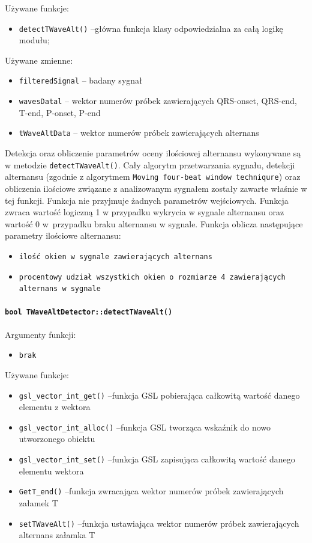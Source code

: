 \documentclass[a4paper, 11pt]{article}
\begin{document}
Używane funkcje:
\begin{itemize}
\item \verb+detectTWaveAlt()+ --główna funkcja klasy odpowiedzialna za całą logikę modułu;
\end{itemize}

\medskip{}

Używane zmienne:
\begin{itemize}
\item \verb+filteredSignal+ --  badany sygnał
\item \verb+wavesDatal+ -- wektor numerów próbek zawierających QRS-onset, QRS-end, T-end, P-onset, P-end
\item \verb+tWaveAltData+ -- wektor numerów próbek zawierających alternans
\end{itemize}


\medskip{}

Detekcja oraz obliczenie parametrów oceny ilościowej alternansu wykonywane są w metodzie  \verb|detectTWaveAlt()|. Cały algorytm przetwarzania sygnału, detekcji alternansu (zgodnie z algorytmem  \verb|Moving four-beat window techniqure|) oraz obliczenia ilościowe związane z analizowanym sygnałem zostały zawarte właśnie w tej funkcji. Funkcja nie przyjmuje żadnych parametrów wejściowych. Funkcja zwraca wartość logiczną 1 w przypadku wykrycia w sygnale alternansu oraz wartość 0 w~przypadku braku alternansu w sygnale. Funkcja oblicza następujące parametry ilościowe alternansu:
\begin{itemize}
\item \verb+ilość okien w sygnale zawierających alternans+
\item \verb+procentowy udział wszystkich okien o rozmiarze 4 zawierających alternans w sygnale+
\end{itemize}


\paragraph{\texttt{bool TWaveAltDetector::detectTWaveAlt()}}

\medskip{}

Argumenty funkcji:

\begin{itemize}
\item \verb+brak+
\end{itemize}
\medskip{}

Używane funkcje:
\begin{itemize}
\item \verb+gsl_vector_int_get()+ --funkcja GSL pobierająca całkowitą wartość danego elementu z wektora
\item \verb+gsl_vector_int_alloc()+ --funkcja GSL tworząca wskaźnik do nowo utworzonego obiektu 
\item \verb+gsl_vector_int_set()+ --funkcja GSL zapisująca całkowitą wartość danego elementu wektora
\item \verb+GetT_end()+ --funkcja zwracająca wektor numerów próbek zawierających załamek T
\item \verb+setTWaveAlt()+ --funkcja ustawiająca wektor numerów próbek zawierających alternans załamka T
\end{itemize}
\end{document}
